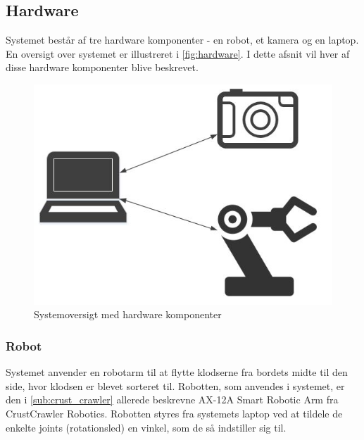 \subsection{Hardware} %
\label{sub:hardware}

Systemet består af tre hardware komponenter - en robot, et kamera og en laptop.
En oversigt over systemet er illustreret i \autoref{fig:hardware}.
I dette afsnit vil hver af disse hardware komponenter blive beskrevet.


\begin{figure}[h]
\centering
\includegraphics[scale=0.5]{images/hardware}
\caption{Systemoversigt med hardware komponenter}
\label{fig:hardware}
\end{figure}

\subsubsection{Robot} %
\label{subsub:robot}


Systemet anvender en robotarm til at flytte klodserne fra bordets midte til den side, hvor klodsen er blevet sorteret til.
Robotten, som anvendes i systemet, er den i \autoref{sub:crust_crawler} allerede beskrevne AX-12A Smart Robotic Arm fra CrustCrawler Robotics.
Robotten styres fra systemets laptop ved at tildele de enkelte joints (rotationsled) en vinkel, som de så indstiller sig til.


